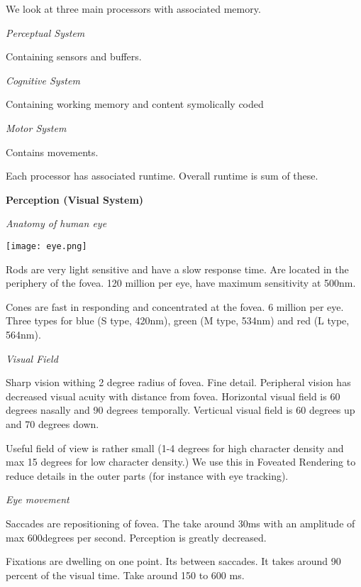 We look at three main processors with associated memory.

\textit{Perceptual System} \smallskip

Containing sensors and buffers. \medskip

\textit{Cognitive System} \smallskip

Containing working memory and content symolically coded \medskip

\textit{Motor System} \smallskip

Contains movements. \medskip

Each processor has associated runtime. Overall runtime is sum of these.  \medskip

\textbf{Perception (Visual System)}


\textit{Anatomy of human eye} \smallskip


\begin{center}
	\texttt{[image: eye.png]}
\end{center}

\medskip

Rods are very light sensitive and have a slow response time. Are located in the periphery of the fovea. 120 million per eye, have maximum sensitivity at 500nm. \medskip

Cones are fast in responding and concentrated at the fovea. 6 million per eye. Three types for blue (S type, 420nm), green (M type, 534nm) and red (L type, 564nm). \medskip


\textit{Visual Field} \smallskip

Sharp vision withing 2 degree radius of fovea. Fine detail. Peripheral vision has decreased visual acuity with distance from fovea. Horizontal visual field is 60 degrees nasally and 90 degrees temporally. Verticual visual field is 60 degrees up and 70 degrees down. \medskip

Useful field of view is rather small (1-4 degrees for high character density and max 15 degrees for low character density.) We use this in Foveated Rendering to reduce details in the outer parts (for instance with eye tracking). \medskip

\textit{Eye movement} \smallskip

Saccades are repositioning of fovea. The take around 30ms with an amplitude of max 600degrees per second. Perception is greatly decreased.\medskip

Fixations are dwelling on one point. Its between saccades. It takes around 90 percent of the visual time. Take around 150 to 600 ms. \medskip

